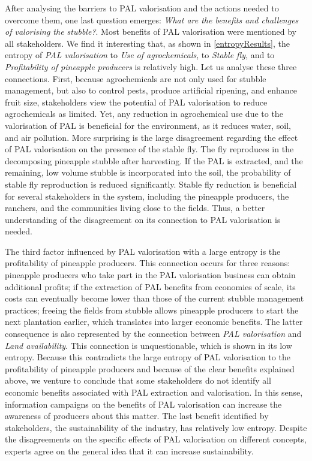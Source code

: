 After analysing the barriers to PAL valorisation and the actions needed to overcome them, one last question emerges: \textit{What are the benefits and challenges of valorising the stubble?}. Most benefits of PAL valorisation were mentioned by all stakeholders. We find it interesting that, as shown in \cref{entropyResults}, the entropy of \textit{PAL valorisation} to \textit{Use of agrochemicals}, to \textit{Stable fly}, and to \textit{Profitability of pineapple producers} is relatively high. Let us analyse these three connections. First, because agrochemicals are not only used for stubble management, but also to control pests, produce artificial ripening, and enhance fruit size, stakeholders view the potential of PAL valorisation to reduce agrochemicals as limited. Yet, any reduction in agrochemical use due to the valorisation of PAL is beneficial for the environment, as it reduces water, soil, and air pollution. More surprising is the large disagreement regarding the effect of PAL valorisation on the presence of the stable fly. The fly reproduces in the decomposing pineapple stubble after harvesting. If the PAL is extracted, and the remaining, low volume stubble is incorporated into the soil, the probability of stable fly reproduction is reduced significantly. Stable fly reduction is beneficial for several stakeholders in the system, including the pineapple producers, the ranchers, and the communities living close to the fields. Thus, a better understanding of the disagreement on its connection to PAL valorisation is needed. 

The third factor influenced by PAL valorisation with a large entropy is the profitability of pineapple producers. This connection occurs for three reasons: pineapple producers who take part in the PAL valorisation business can obtain additional profits; if the extraction of PAL benefits from economies of scale, its costs can eventually become lower than those of the current stubble management practices; freeing the fields from stubble allows pineapple producers to start the next plantation earlier, which translates into larger economic benefits. The latter consequence is also represented by the connection between \textit{PAL valorisation} and \textit{Land availability}. This connection is unquestionable, which is shown in its low entropy. Because this contradicts the large entropy of PAL valorisation to the profitability of pineapple producers and because of the clear benefits explained above, we venture to conclude that some stakeholders do not identify all economic benefits associated with PAL extraction and valorisation. In this sense, information campaigns on the benefits of PAL valorisation can increase the awareness of producers about this matter. The last benefit identified by stakeholders, the sustainability of the industry, has relatively low entropy. Despite the disagreements on the specific effects of PAL valorisation on different concepts, experts agree on the general idea that it can increase sustainability. 

